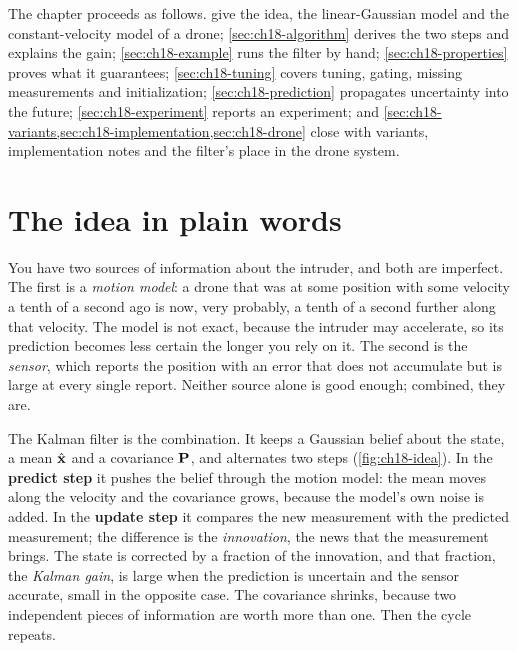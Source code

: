 The chapter proceeds as follows. 
give the idea, the linear-Gaussian model and the constant-velocity model of a
drone; \cref{sec:ch18-algorithm} derives the two steps and explains the gain;
\cref{sec:ch18-example} runs the filter by hand; \cref{sec:ch18-properties}
proves what it guarantees; \cref{sec:ch18-tuning} covers tuning, gating,
missing measurements and initialization; \cref{sec:ch18-prediction}
propagates uncertainty into the future; \cref{sec:ch18-experiment} reports an
experiment; and \cref{sec:ch18-variants,sec:ch18-implementation,sec:ch18-drone}
close with variants, implementation notes and the filter's place in the drone
system.

\section{The idea in plain words}
\label{sec:ch18-intuition}

You have two sources of information about the intruder, and both are
imperfect. The first is a \emph{motion model}: a drone that was at some
position with some velocity a tenth of a second ago is now, very probably, a
tenth of a second further along that velocity. The model is not exact, because
the intruder may accelerate, so its prediction becomes less certain the longer
you rely on it. The second is the \emph{sensor}, which reports the position
with an error that does not accumulate but is large at every single report.
Neither source alone is good enough; combined, they are.

The Kalman filter is the combination. It keeps a Gaussian
belief about the state, a mean $\hat{\mathbf{x}}$ and a covariance $\mathbf{P}$, and
alternates two steps (\cref{fig:ch18-idea}). In the \textbf{predict
step} it pushes the belief through the
motion model: the mean moves along the velocity and the covariance grows,
because the model's own noise is added. In the \textbf{update
step} it compares the new measurement with
the predicted measurement; the difference is the \emph{innovation}, the news
that the measurement brings. The state is corrected by a fraction of the
innovation, and that fraction, the \emph{Kalman gain}, is large when the
prediction is uncertain and the sensor accurate, small in the opposite case.
The covariance shrinks, because two independent pieces of information are
worth more than one. Then the cycle repeats.

